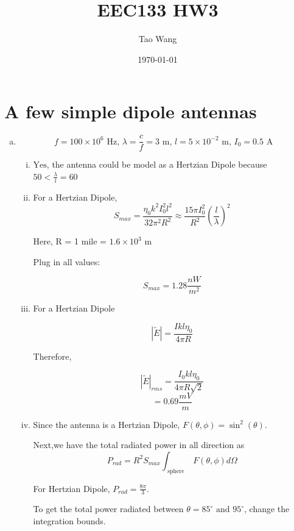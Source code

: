 \documentclass{article} %
\begin{document}
\title{EEC133 HW3}
\author{Tao Wang}
\date{\today}

\maketitle
\tableofcontents

\section{A few simple dipole antennas}
\begin{enumerate}[(a)]
    \item
          \[f = 100 \times 10^6 \text{ Hz, } \lambda = \frac{c}{f} = 3 \text{ m, } l = 5 \times 10^{-2} \text{ m, } I_0 = 0.5 \text{ A }\]
          \begin{enumerate}[(i)]
              \item $\boxed{\text{Yes}}$, the antenna could be model as a Hertzian Dipole because $50 < \frac{\lambda}{l} = 60$
              \item For a Hertzian Dipole,
                    \[S_{max} = \frac{\eta_0 k^2 I_0 ^2 l^2}{32 \pi^2 R^2} \approx \frac{15 \pi I_0 ^2}{R^2}\left(\frac{l}{\lambda}\right)^2\]

                    Here, R = 1 mile = $1.6 \times 10^3 \text{ m}$

                    Plug in all values:

                    \[\boxed{S_{max} = 1.28 \si{\frac{nW}{m^2}}}\]
              \item
                    For a Hertzian Dipole

                    \[|\widetilde{E}| = \frac{I k l \eta_0}{4 \pi R}\]

                    Therefore,

                    \[|\widetilde{E}|_{rms} = \frac{I_0 k l \eta_0}{4 \pi R \sqrt{2}}\]
                    \[= \boxed{0.69 \si{\frac{mV}{m}}}\]
              \item
                    Since the antenna is a Hertzian Dipole, $F(\theta, \phi) = \sin^2(\theta)$.

                    Next,we have the total radiated power in all direction as
                    \[P_{rad} = R^2 S_{max}\int_{\text{ sphere }}  F(\theta, \phi) d\Omega\]

                    For Hertzian Dipole, $P_{rad} = \frac{8 \pi}{3}$.

                    To get the total power radiated between $\theta = 85^{\circ} \text{ and } 95^{\circ}$, change the integration bounds.


\end{enumerate}
\end{enumerate}
\end{document}
